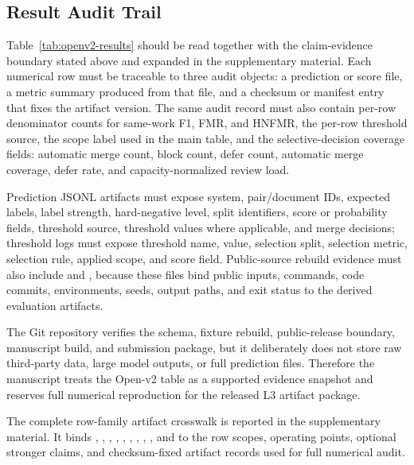 \documentclass[preprint,12pt]{elsarticle}
\begin{document}
\subsection{Result Audit Trail}

Table~\ref{tab:openv2-results} should be read together with the claim-evidence boundary stated above and expanded in the supplementary material. Each numerical row must be traceable to three audit objects: a prediction or score file, a metric summary produced from that file, and a checksum or manifest entry that fixes the artifact version. The same audit record must also contain per-row denominator counts for same-work F1, FMR, and HNFMR, the per-row threshold source, the scope label used in the main table, and the selective-decision coverage fields: automatic merge count, block count, defer count, automatic merge coverage, defer rate, and capacity-normalized review load.

Prediction JSONL artifacts must expose system, pair/document IDs, expected labels, label strength, hard-negative level, split identifiers, score or probability fields, threshold source, threshold values where applicable, and merge decisions; threshold logs must expose threshold name, value, selection split, selection metric, selection rule, applied scope, and score field. Public-source rebuild evidence must also include  and , because these files bind public inputs, commands, code commits, environments, seeds, output paths, and exit status to the derived evaluation artifacts.

The Git repository verifies the schema, fixture rebuild, public-release boundary, manuscript build, and submission package, but it deliberately does not store raw third-party data, large model outputs, or full prediction files. Therefore the manuscript treats the Open-v2 table as a supported evidence snapshot and reserves full numerical reproduction for the released L3 artifact package.

The complete row-family artifact crosswalk is reported in the supplementary material. It binds , , , , , , , , , and  to the row scopes, operating points, optional stronger claims, and checksum-fixed artifact records used for full numerical audit.
\end{document}
